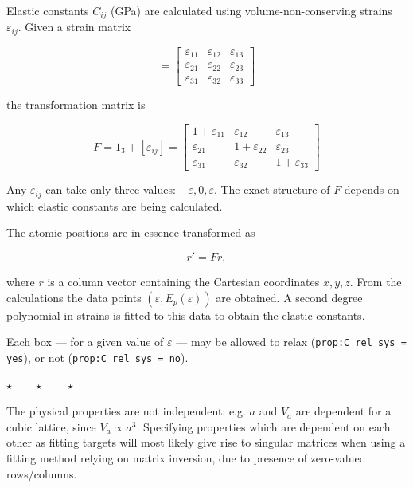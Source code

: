 \documentclass[a4paper,12pt,pdftex,onecolumn]{article}
\newcommand{\stars}{\begin{center}%
\vspace{1em plus 0.5em minus 0.5em}%
$\star \qquad \star \qquad \star$%
\vspace{1em plus 0.5em minus 0.5em}%
\end{center}}
\begin{document}
Elastic constants $C_{ij}$ (GPa) are calculated using volume-non-conserving strains
$\varepsilon_{ij}$. Given a strain matrix

\begin{equation}
[\varepsilon_{ij}] =
\left[
\begin{array}{ccc}
\varepsilon_{11} & \varepsilon_{12} & \varepsilon_{13} \\
\varepsilon_{21} & \varepsilon_{22} & \varepsilon_{23} \\
\varepsilon_{31} & \varepsilon_{32} & \varepsilon_{33}
\end{array}
\right]
\end{equation}

the transformation matrix is

\begin{equation}
F = 1_3 + [\varepsilon_{ij}] =
\left[
\begin{array}{ccc}
1+\varepsilon_{11} & \varepsilon_{12} & \varepsilon_{13} \\
\varepsilon_{21} & 1+\varepsilon_{22} & \varepsilon_{23} \\
\varepsilon_{31} & \varepsilon_{32} & 1+\varepsilon_{33}
\end{array}
\right]
\end{equation}

Any $\varepsilon_{ij}$ can take only three values: $-\varepsilon, 0, \varepsilon$.
The exact structure of $F$ depends on which elastic constants are being
calculated.

The atomic positions are in essence transformed as

\begin{equation}
r' = F r,
\end{equation}

where $r$ is a column vector containing the Cartesian coordinates $x,y,z$.
From the calculations the data points $(\varepsilon, E_p(\varepsilon))$ are obtained.
A second degree polynomial in strains is fitted to this data to obtain the elastic
constants.

Each box --- for a given value of $\varepsilon$ --- may be allowed to
relax (\verb+prop:C_rel_sys = yes+), or not (\verb+prop:C_rel_sys = no+).

\stars

The physical properties are not independent: e.g. $a$ and $V_a$ are dependent
for a cubic lattice, since $V_a \propto a^3$. Specifying properties which are
dependent on each other as fitting targets will most likely give rise to
singular matrices when using a fitting method relying on matrix inversion,
due to presence of zero-valued rows/columns.
\end{document}
